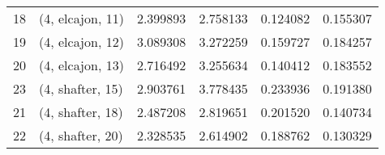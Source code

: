 \begin{tabular}{llrrrr}
18 &  (4, elcajon, 11) &   2.399893 &   2.758133 &   0.124082 &  0.155307 \\
19 &  (4, elcajon, 12) &   3.089308 &   3.272259 &   0.159727 &  0.184257 \\
20 &  (4, elcajon, 13) &   2.716492 &   3.255634 &   0.140412 &  0.183552 \\
23 &  (4, shafter, 15) &   2.903761 &   3.778435 &   0.233936 &  0.191380 \\
21 &  (4, shafter, 18) &   2.487208 &   2.819651 &   0.201520 &  0.140734 \\
22 &  (4, shafter, 20) &   2.328535 &   2.614902 &   0.188762 &  0.130329 \\
\bottomrule
\end{tabular}
